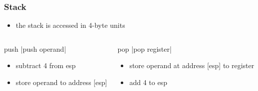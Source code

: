\documentclass[dvipsnames]{beamer}
\begin{document}
\begin{frame}
  \frametitle{Stack}

  \begin{itemize}
    \item the stack is accessed in 4-byte units
  \end{itemize}

  \begin{columns}[t]
    \begin{block}{push}
      |push operand|
      \begin{itemize}
        \item subtract 4 from esp
        \item store operand to address [esp]
      \end{itemize}
    \end{block}

    \begin{block}{pop}
      |pop register|
      \begin{itemize}
        \item store operand at address [esp] to register
        \item add 4 to esp
      \end{itemize}
    \end{block}
  \end{columns}
\end{frame}
\end{document}
